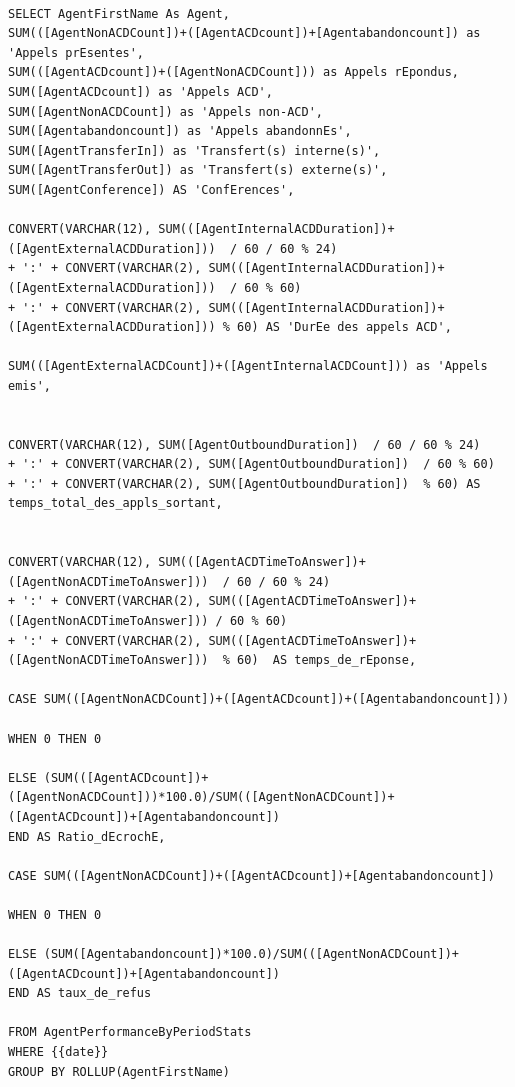 \documentclass[a4paper,12pt]{report}
\begin{document}
\lstset{
language=SQL,
basicstyle=\footnotesize,
}
\begin{lstlisting}

SELECT AgentFirstName As Agent,
SUM(([AgentNonACDCount])+([AgentACDcount])+[Agentabandoncount]) as 'Appels prEsentes',
SUM(([AgentACDcount])+([AgentNonACDCount])) as Appels rEpondus,
SUM([AgentACDcount]) as 'Appels ACD',
SUM([AgentNonACDCount]) as 'Appels non-ACD',
SUM([Agentabandoncount]) as 'Appels abandonnEs',
SUM([AgentTransferIn]) as 'Transfert(s) interne(s)',
SUM([AgentTransferOut]) as 'Transfert(s) externe(s)',
SUM([AgentConference]) AS 'ConfErences',

CONVERT(VARCHAR(12), SUM(([AgentInternalACDDuration])+([AgentExternalACDDuration]))  / 60 / 60 % 24) 
+ ':' + CONVERT(VARCHAR(2), SUM(([AgentInternalACDDuration])+([AgentExternalACDDuration]))  / 60 % 60) 
+ ':' + CONVERT(VARCHAR(2), SUM(([AgentInternalACDDuration])+([AgentExternalACDDuration])) % 60) AS 'DurEe des appels ACD',

SUM(([AgentExternalACDCount])+([AgentInternalACDCount])) as 'Appels emis',


CONVERT(VARCHAR(12), SUM([AgentOutboundDuration])  / 60 / 60 % 24) 
+ ':' + CONVERT(VARCHAR(2), SUM([AgentOutboundDuration])  / 60 % 60) 
+ ':' + CONVERT(VARCHAR(2), SUM([AgentOutboundDuration])  % 60) AS temps_total_des_appls_sortant,


CONVERT(VARCHAR(12), SUM(([AgentACDTimeToAnswer])+([AgentNonACDTimeToAnswer]))  / 60 / 60 % 24) 
+ ':' + CONVERT(VARCHAR(2), SUM(([AgentACDTimeToAnswer])+([AgentNonACDTimeToAnswer])) / 60 % 60) 
+ ':' + CONVERT(VARCHAR(2), SUM(([AgentACDTimeToAnswer])+([AgentNonACDTimeToAnswer]))  % 60)  AS temps_de_rEponse,

CASE SUM(([AgentNonACDCount])+([AgentACDcount])+([Agentabandoncount]))

WHEN 0 THEN 0 

ELSE (SUM(([AgentACDcount])+([AgentNonACDCount]))*100.0)/SUM(([AgentNonACDCount])+([AgentACDcount])+[Agentabandoncount]) 
END AS Ratio_dEcrochE,

CASE SUM(([AgentNonACDCount])+([AgentACDcount])+[Agentabandoncount])

WHEN 0 THEN 0 

ELSE (SUM([Agentabandoncount])*100.0)/SUM(([AgentNonACDCount])+([AgentACDcount])+[Agentabandoncount])
END AS taux_de_refus

FROM AgentPerformanceByPeriodStats
WHERE {{date}}
GROUP BY ROLLUP(AgentFirstName)

\end{lstlisting}
\end{document}
